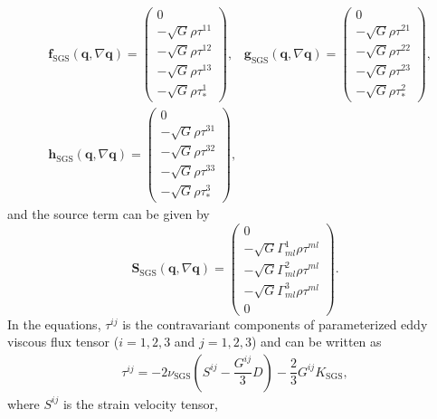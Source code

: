 \begin{align}    
&\bm{f}_\textrm{SGS}(\bm{q},\nabla \bm{q})
    =\begin{pmatrix}
    0 \\
    -\sqrt{G} \rho \tau^{11}  \\
    -\sqrt{G} \rho \tau^{12}  \\
    -\sqrt{G} \rho \tau^{13}  \\
    -\sqrt{G} \rho \tau_*^1
  \end{pmatrix}, \;\;\;
\bm{g}_\textrm{SGS}(\bm{q},\nabla \bm{q})
    =\begin{pmatrix}
    0 \\
    -\sqrt{G} \rho \tau^{21}  \\
    -\sqrt{G} \rho \tau^{22}  \\
    -\sqrt{G} \rho \tau^{23}  \\
    -\sqrt{G} \rho \tau_*^2
    \end{pmatrix}, \\
&\bm{h}_\textrm{SGS}(\bm{q},\nabla \bm{q})
    =\begin{pmatrix}
    0 \\
    -\sqrt{G} \rho \tau^{31}  \\
    -\sqrt{G} \rho \tau^{32}  \\
    -\sqrt{G} \rho \tau^{33}  \\
    -\sqrt{G} \rho \tau_*^3
    \end{pmatrix}, 
\end{align}
and 
the source term can be given by 
\begin{equation}
  \bm{S}_\textrm{SGS}(\bm{q},\nabla \bm{q}) = \begin{pmatrix}
    0 \\
    -\sqrt{G} \Gamma^1_{ml}\rho \tau^{ml}  \\
    -\sqrt{G} \Gamma^2_{ml}\rho \tau^{ml}  \\
    -\sqrt{G} \Gamma^3_{ml}\rho \tau^{ml}  \\
    0
    \end{pmatrix}.
\end{equation}
In the equations, 
$\tau^{ij}$ is the contravariant components of parameterized eddy viscous flux tensor 
($i=1,2,3$ and $j=1,2,3$) and can be written as 
\begin{eqnarray}
  \tau^{ij} = - 2 \nu_\textrm{SGS}
   \left( 
    S^{ij} - \dfrac{G^{ij}}{3} D
   \right)
   - \dfrac{2}{3} G^{ij} K_\textrm{SGS}, 
\end{eqnarray} 
where
$S^{ij}$ is the strain velocity tensor, 
